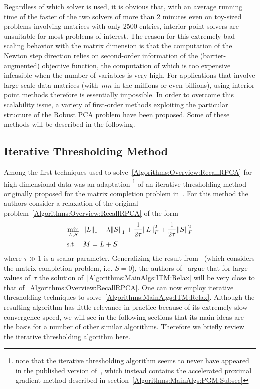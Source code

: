Regardless of which solver is used, it is obvious that, with an average running time of the faster of the two solvers of more than 2 minutes even on toy-sized problems involving matrices with only 2500 entries, interior point solvers are unsuitable for most problems of interest. The reason for this extremely bad scaling behavior with the matrix dimension is that the computation of the Newton step direction relies on second-order information of the (barrier-augmented) objective function, the computation of which is too expensive infeasible when the number of variables is very high. For applications that involve large-scale data matrices (with~$mn$ in the millions or even billions), using interior point methods therefore is essentially impossible. In order to overcome this scalability issue, a variety of first-order methods exploiting the particular structure of the Robust PCA problem have been proposed. Some of these methods will be described in the following.


\subsection{Iterative Thresholding Method}
\label{Algorithms:MainAlgs:ITM:Subsec}

Among the first techniques used to solve~\eqref{Algorithms:Overview:RecallRPCA} for high-dimensional data was an adaptation \cite{Wright:2009fk}\footnote{note that the iterative thresholding algorithm seems to never have appeared in the published version of~\cite{Wright:2009fk}, which instead contains the accelerated proximal gradient method described in section~\ref{Algorithms:MainAlgs:PGM:Subsec}} of an iterative thresholding method originally proposed for the matrix completion problem in~\cite{Cai:2010uq}. For this method the authors consider a relaxation of the original problem~\eqref{Algorithms:Overview:RecallRPCA} of the form 
%
\begin{align}
\begin{split}
\min_{L,S} \;\; &{\left\|L\right\|}_{*}^{} + \lambda {\left\|S\right\|}_{1}^{} + \frac{1}{2\tau} {\left\|L\right\|}_{F}^{2} + \frac{1}{2\tau} {\left\|S\right\|}_{F}^{2} \\
\text{s.t.} \quad &M=L+S
\end{split}
\label{Algorithms:MainAlgs:ITM:Relax}
\end{align}
%
where $\tau \gg 1$ is a scalar parameter. Generalizing the result from~\cite{Cai:2010uq} (which considers the matrix completion problem, i.e. $S=0$), the authors of~\cite{Wright:2009fk} argue that for large values of~$\tau$ the solution of~\eqref{Algorithms:MainAlgs:ITM:Relax} will be very close to that of~\eqref{Algorithms:Overview:RecallRPCA}. One can now employ iterative thresholding techniques to solve~\eqref{Algorithms:MainAlgs:ITM:Relax}. Although the resulting algorithm has little relevance in practice because of its extremely slow convergence speed, we will see in the following sections that its main ideas are the basis for a number of other similar algorithms. Therefore we briefly review the iterative thresholding algorithm here.\\ 


